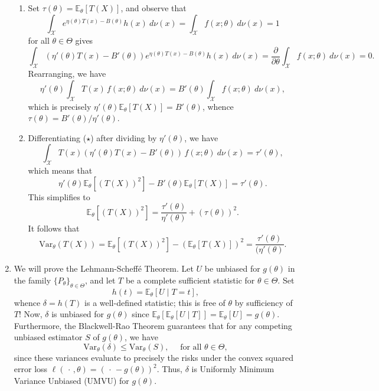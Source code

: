 \documentclass[11pt]{article}
\begin{document}
\begin{enumerate}
    \begin{enumerate}
        \item Set $\tau(\theta) = \mathbb{E}_\theta[T(X)]$, and observe that
        \[
            \int_{\mathcal{X}} e^{\eta(\theta)T(x) - B(\theta)} h(x) \:d\nu(x)
                = \int_{\mathcal{X}} f(x; \theta) \:d\nu(x)
                = 1
        \] for all $\theta \in \Theta$ gives \[
            \int_{\mathcal{X}} (\eta'(\theta) T(x) - B'(\theta)) e^{\eta(\theta) T(x) - B(\theta)} h(x) \:d\nu(x)
                = \frac{\partial}{\partial \theta} \int_{\mathcal{X}} f(x; \theta) \:d\nu(x)
                = 0.
        \] Rearranging, we have \[
            \eta'(\theta) \int_{\mathcal{X}} T(x)\, f(x; \theta) \:d\nu(x)
                = B'(\theta) \int_{\mathcal{X}} f(x; \theta) \:d\nu(x), \tag{$\star$}
        \] which is precisely $\eta'(\theta) \mathbb{E}_\theta[T(X)] =
        B'(\theta)$, whence $\tau(\theta) = B'(\theta) / \eta'(\theta)$.


        \item Differentiating ($\star$) after dividing by $\eta'(\theta)$, we
        have \[
            \int_{\mathcal{X}} T(x)(\eta'(\theta)T(x) - B'(\theta))\, f(x; \theta) \:d\nu(x)
                = \tau'(\theta),
        \] which means that \[
            \eta'(\theta) \mathbb{E}_\theta[(T(X))^2] - B'(\theta)\mathbb{E}_\theta[T(X)] = \tau'(\theta).
        \] This simplifies to \[
            \mathbb{E}_\theta[(T(X))^2] = \frac{\tau'(\theta)}{\eta'(\theta)} + (\tau(\theta))^2.
        \] It follows that \[
            \text{Var}_\theta(T(X)) = \mathbb{E}_\theta[(T(X))^2] - (\mathbb{E}_\theta[T(X)])^2 = \frac{\tau'(\theta)}{(\eta'(\theta)}.
        \]
    \end{enumerate}


    \item We will prove the Lehmann-Scheff\'e Theorem.
    Let $U$ be unbiased for $g(\theta)$ in the family $\{P_\theta\}_{\theta
    \in \Theta}$, and let $T$ be a complete sufficient statistic for $\theta
    \in \Theta$.
    Set \[
        h(t) = \mathbb{E}_\theta\left[U\mid T = t\right],
    \] whence $\delta = h(T)$ is a well-defined statistic; this is free of
    $\theta$ by sufficiency of $T$!
    Now, $\delta$ is unbiased for $g(\theta)$ since
    $\mathbb{E}_\theta\left[\mathbb{E}_\theta[U\mid T]\right] =
    \mathbb{E}_\theta[U] = g(\theta)$.
    Furthermore, the Blackwell-Rao Theorem guarantees that for any competing
    unbiased estimator $S$ of $g(\theta)$, we have \[
        \text{Var}_\theta(\delta) \leq \text{Var}_\theta(S), \quad\text{ for all } \theta \in \Theta,
    \] since these variances evaluate to precisely the risks under the convex
    squared error loss $\ell(\,\cdot\,, \theta) = (\,\cdot\, - g(\theta))^2$.
    Thus, $\delta$ is Uniformly Minimum Variance Unbiased (UMVU) for
    $g(\theta)$.


\end{enumerate}
\end{document}
